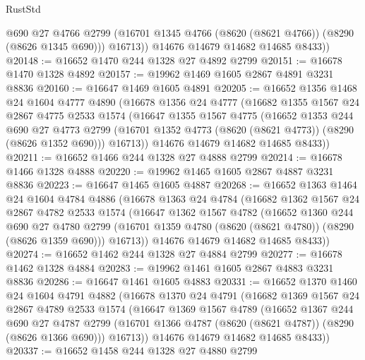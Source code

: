 \begin{lexlean}{RustStd}
\begin{coremodule}
            @690
            @27
            @4766
            @2799
            (@16701 @1345 @4766 (@8620 (@8621 @4766)) (@8290 (@8626 @1345 @690)))
            @16713))
        @14676
        @14679
        @14682
        @14685
        @8433))
@20148 := @16652 @1470 @244 @1328 @27 @4892 @2799
@20151 := @16678 @1470 @1328 @4892
@20157 := @19962 @1469 @1605 @2867 @4891 @3231 @8836
@20160 := @16647 @1469 @1605 @4891
@20205 := @16652
    @1356
    @1468
    @24
    @1604
    @4777
    @4890
    (@16678
      @1356
      @24
      @4777
      (@16682
        @1355
        @1567
        @24
        @2867
        @4775
        @2533
        @1574
        (@16647
          @1355
          @1567
          @4775
          (@16652
            @1353
            @244
            @690
            @27
            @4773
            @2799
            (@16701 @1352 @4773 (@8620 (@8621 @4773)) (@8290 (@8626 @1352 @690)))
            @16713))
        @14676
        @14679
        @14682
        @14685
        @8433))
@20211 := @16652 @1466 @244 @1328 @27 @4888 @2799
@20214 := @16678 @1466 @1328 @4888
@20220 := @19962 @1465 @1605 @2867 @4887 @3231 @8836
@20223 := @16647 @1465 @1605 @4887
@20268 := @16652
    @1363
    @1464
    @24
    @1604
    @4784
    @4886
    (@16678
      @1363
      @24
      @4784
      (@16682
        @1362
        @1567
        @24
        @2867
        @4782
        @2533
        @1574
        (@16647
          @1362
          @1567
          @4782
          (@16652
            @1360
            @244
            @690
            @27
            @4780
            @2799
            (@16701 @1359 @4780 (@8620 (@8621 @4780)) (@8290 (@8626 @1359 @690)))
            @16713))
        @14676
        @14679
        @14682
        @14685
        @8433))
@20274 := @16652 @1462 @244 @1328 @27 @4884 @2799
@20277 := @16678 @1462 @1328 @4884
@20283 := @19962 @1461 @1605 @2867 @4883 @3231 @8836
@20286 := @16647 @1461 @1605 @4883
@20331 := @16652
    @1370
    @1460
    @24
    @1604
    @4791
    @4882
    (@16678
      @1370
      @24
      @4791
      (@16682
        @1369
        @1567
        @24
        @2867
        @4789
        @2533
        @1574
        (@16647
          @1369
          @1567
          @4789
          (@16652
            @1367
            @244
            @690
            @27
            @4787
            @2799
            (@16701 @1366 @4787 (@8620 (@8621 @4787)) (@8290 (@8626 @1366 @690)))
            @16713))
        @14676
        @14679
        @14682
        @14685
        @8433))
@20337 := @16652 @1458 @244 @1328 @27 @4880 @2799

\end{coremodule}
\end{lexlean}

